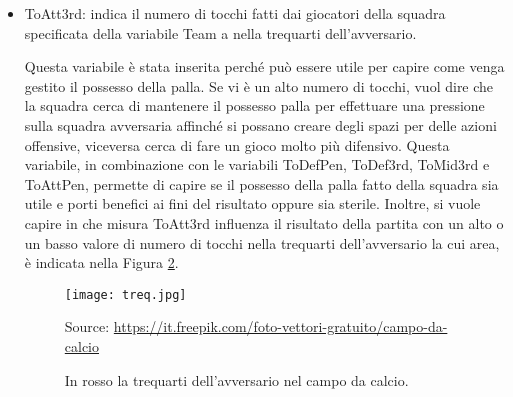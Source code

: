 \begin{itemize}
	Questa variabile è stata inserita perché può essere utile per capire come venga gestito il possesso della palla. Se vi è un alto numero di tocchi, vuol dire che la squadra cerca di mantenere il possesso palla cercando di creare delle azioni offensive, viceversa cerca di fare un gioco più difensivo. Questa variabile, in combinazione con le variabili \textsf{ToDefPen}, \textsf{ToDef3rd}, \textsf{ToAtt3rd} e \textsf{ToAttPen}, permette di capire se il possesso della palla fatto dalla squadra sia utile e porti benefici ai fini del risultato oppure sia sterile. Inoltre, si vuole capire in che misura \textsf{ToMid3rd} influenza il risultato della partita con un alto o un basso valore di numero di tocchi a centrocampo la cui area, è indicata nella Figura \ref{fig:cen}.
	
	\begin{figure}[!ht]
		\begin{center}
			\texttt{[image: cen.jpg]}
			\caption{In rosso il centrocampo nel campo da calcio.}
			Source: \url{https://it.freepik.com/foto-vettori-gratuito/campo-da-calcio}  
			\label{fig:cen}
		\end{center}
	\end{figure}
	
	\item \textsf{ToAtt3rd}: indica il numero di tocchi fatti dai giocatori della squadra specificata della variabile \textsf{Team} a nella trequarti dell'avversario. 
	
	Questa variabile è stata inserita perché può essere utile per capire come venga gestito il possesso della palla. Se vi è un alto numero di tocchi, vuol dire che la squadra cerca di mantenere il possesso palla per effettuare una pressione sulla squadra avversaria affinché si possano creare degli spazi per delle azioni offensive, viceversa cerca di fare un gioco molto più difensivo. Questa variabile, in combinazione con le variabili \textsf{ToDefPen}, \textsf{ToDef3rd}, \textsf{ToMid3rd} e \textsf{ToAttPen}, permette di capire se il possesso della palla fatto della squadra sia utile e porti benefici ai fini del risultato oppure sia sterile. Inoltre, si vuole capire in che misura \textsf{ToAtt3rd} influenza il risultato della partita con un alto o un basso valore di numero di tocchi nella trequarti dell'avversario la cui area, è indicata nella Figura \ref{fig:treq}.
	
	\begin{figure}[!ht]
		\begin{center}
			\texttt{[image: treq.jpg]}
			\caption{In rosso la trequarti dell'avversario nel campo da calcio.} 
			Source: \url{https://it.freepik.com/foto-vettori-gratuito/campo-da-calcio} 
			\label{fig:treq}
		\end{center}
	\end{figure}
	

\end{itemize}

